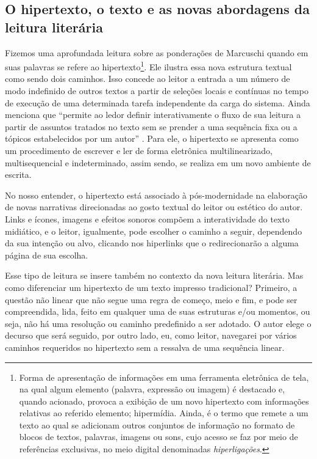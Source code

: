 \begin{refsection}
    \section{O hipertexto, o texto e as novas abordagens da leitura literária}

    Fizemos uma aprofundada leitura sobre as ponderações de Marcuschi quando em suas palavras se refere ao hipertexto\footnote{Forma de apresentação de informações em uma ferramenta eletrônica de tela, na qual algum elemento (palavra, expressão ou imagem) é destacado e, quando acionado, provoca a exibição de um novo hipertexto com informações relativas ao referido elemento; hipermídia. Ainda, é o termo que remete a um texto ao qual se adicionam outros conjuntos de informação no formato de blocos de textos, palavras, imagens ou sons, cujo acesso se faz por meio de referências exclusivas, no meio digital denominadas \textit{hiperligações}.}. Ele ilustra essa nova estrutura textual como sendo dois caminhos. Isso concede ao leitor a entrada a um número de modo indefinido de outros textos a partir de seleções locais e contínuas no tempo de execução de uma determinada tarefa independente da carga do sistema. Ainda menciona que “permite ao ledor definir interativamente o fluxo de sua leitura a partir de assuntos tratados no texto sem se prender a uma sequência fixa ou a tópicos estabelecidos por um autor” \cite[p.~86]{Marcuschi2001Hipertexto}. Para ele, o hipertexto se apresenta como um procedimento de escrever e ler de forma eletrônica multilinearizado, multisequencial e indeterminado, assim sendo, se realiza em um novo ambiente de escrita.  

    No nosso entender, o hipertexto está associado à pós-modernidade na elaboração de novas narrativas direcionadas ao gosto textual do leitor ou estético do autor. Links e ícones, imagens e efeitos sonoros compõem a interatividade do texto midiático, e o leitor, igualmente, pode escolher o caminho a seguir, dependendo da sua intenção ou alvo, clicando nos hiperlinks que o redirecionarão a alguma página de sua escolha.           

    Esse tipo de leitura se insere também no contexto da nova leitura literária. Mas como diferenciar um hipertexto de um texto impresso tradicional?   Primeiro, a questão não linear que não segue uma regra de começo, meio e   fim, e   pode ser compreendida, lida, feito em qualquer uma de suas estruturas e/ou momentos, ou seja, não há uma resolução ou caminho predefinido a ser adotado. O autor elege o decurso que será seguido, por outro lado, eu, como leitor, navegarei por vários caminhos requeridos no hipertexto sem a ressalva de uma sequência linear.   


\end{refsection}
